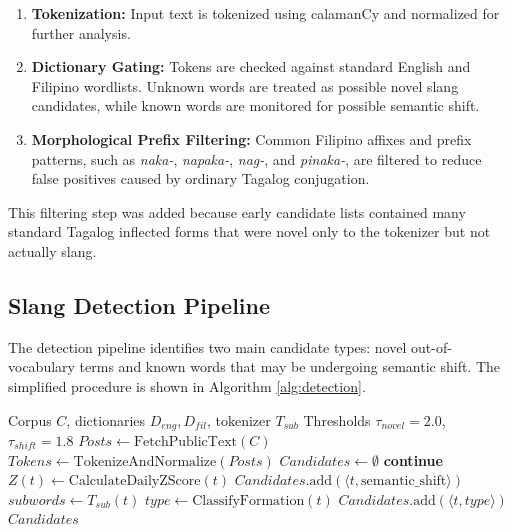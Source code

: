 \begin{enumerate}
    \item \textbf{Tokenization:} Input text is tokenized using calamanCy and normalized for further analysis.
    \item \textbf{Dictionary Gating:} Tokens are checked against standard English and Filipino wordlists. Unknown words are treated as possible novel slang candidates, while known words are monitored for possible semantic shift.
    \item \textbf{Morphological Prefix Filtering:} Common Filipino affixes and prefix patterns, such as \textit{naka-}, \textit{napaka-}, \textit{nag-}, and \textit{pinaka-}, are filtered to reduce false positives caused by ordinary Tagalog conjugation.
\end{enumerate}

This filtering step was added because early candidate lists contained many standard Tagalog inflected forms that were novel only to the tokenizer but not actually slang.

\subsection{Slang Detection Pipeline}

The detection pipeline identifies two main candidate types: novel out-of-vocabulary terms and known words that may be undergoing semantic shift. The simplified procedure is shown in Algorithm \ref{alg:detection}.

\begin{algorithm}[H]
\caption{Slang Candidate Detection Pipeline}
\label{alg:detection}
\begin{algorithmic}[1]
\Require Corpus $C$, dictionaries $D_{eng}, D_{fil}$, tokenizer $T_{sub}$
\Require Thresholds $\tau_{novel}=2.0$, $\tau_{shift}=1.8$
\State $Posts \gets \text{FetchPublicText}(C)$
\State $Tokens \gets \text{TokenizeAndNormalize}(Posts)$
\State $Candidates \gets \emptyset$
        \State \textbf{continue}
    \EndIf
    \State $Z(t) \gets \text{CalculateDailyZScore}(t)$
            \State $Candidates.\text{add}(\langle t,\text{semantic\_shift} \rangle)$
        \EndIf
    \Else
        \State $subwords \gets T_{sub}(t)$
            \State $type \gets \text{ClassifyFormation}(t)$
            \State $Candidates.\text{add}(\langle t,type \rangle)$
        \EndIf
    \EndIf
\EndFor
\State \Return $Candidates$
\end{algorithmic}
\end{algorithm}

